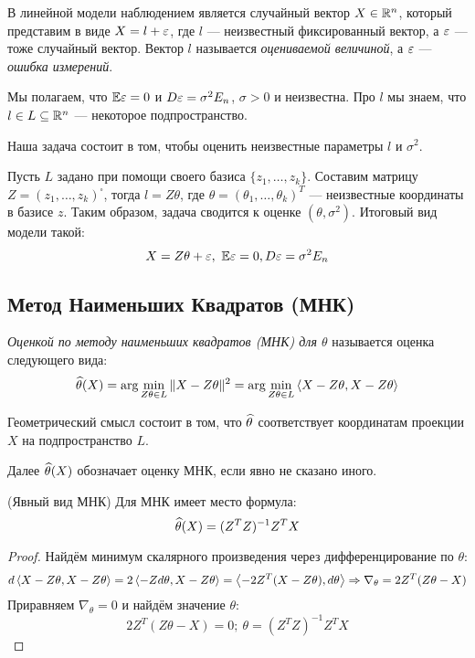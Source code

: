\begin{note}
	В линейной модели наблюдением является случайный вектор $X \in \mathbb{R}^n$, который представим в виде $X = l + \varepsilon$, где $l$ --- неизвестный фиксированный вектор, а $\varepsilon$ --- тоже случайный вектор. Вектор $l$ называется \textit{оцениваемой величиной}, а $\varepsilon$ --- \textit{ошибка измерений}.
	
	Мы полагаем, что $\mathbb{E} \varepsilon = 0$ и $D\varepsilon = \sigma^2 E_n$, $\sigma > 0$ и неизвестна. Про $l$ мы знаем, что $l \in L \subseteq \mathbb{R}^n$ --- некоторое подпространство.
	
	Наша задача состоит в том, чтобы оценить неизвестные параметры $l$ и $\sigma^2$.
	
	Пусть $L$ задано при помощи своего базиса $\{z_1, \ldots, z_k\}$. Составим матрицу $Z = (z_1, \ldots, z_k)^\square$, тогда $l = Z\theta$, где $\theta = (\theta_1, \ldots, \theta_k)^T$ --- неизвестные координаты в базисе $z$. Таким образом, задача сводится к оценке $(\theta, \sigma^2)$. Итоговый вид модели такой:
	\[
		X = Z\theta + \varepsilon,\ \mathbb{E} \varepsilon = 0, D\varepsilon = \sigma^2 E_n
	\]
\end{note}

\subsection{Метод Наименьших Квадратов (МНК)}

\begin{definition}
	\textit{Оценкой по методу наименьших квадратов (МНК) для $\theta$} называется оценка следующего вида:
	\[
		\widehat{\theta}(X) = \arg\min_{Z\theta \in L} \|X - Z\theta\|^2 = \arg\min_{Z\theta \in L} \left\langle X - Z\theta, X - Z\theta\right\rangle
	\]
\end{definition}

\begin{note}
	Геометрический смысл состоит в том, что $\widehat{\theta}$ соответствует координатам проекции $X$ на подпространство $L$.
\end{note}

\begin{note}
	Далее $\widehat{\theta}(X)$ обозначает оценку МНК, если явно не сказано иного.
\end{note}

\begin{lemma} (Явный вид МНК)
	Для МНК имеет место формула:
	\[
		\widehat{\theta}(X) = (Z^TZ)^{-1}Z^TX
	\]
\end{lemma}

\begin{proof}
	Найдём минимум скалярного произведения через дифференцирование по $\theta$:
	\[
		d\left\langle X- Z\theta, X - Z\theta\right\rangle = 2\left\langle-Zd\theta, X - Z\theta\right\rangle = \left\langle-2Z^T(X - Z\theta), d\theta\right\rangle \Rightarrow \nabla_\theta = 2Z^T(Z\theta - X)
	\]
	Приравняем $\nabla_\theta = 0$ и найдём значение $\theta$:
	\[
		2Z^T(Z\theta - X) = 0;\ \theta = (Z^TZ)^{-1}Z^TX
	\]
\end{proof}

